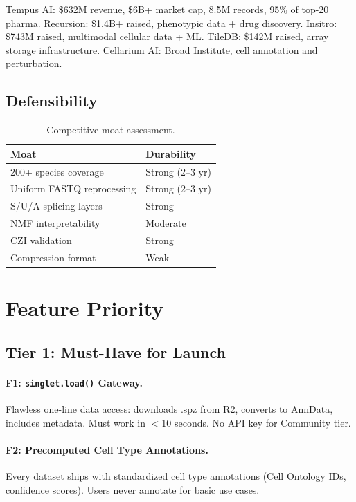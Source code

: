 \documentclass[10pt,twocolumn,letterpaper]{article}
\begin{document}
Tempus AI: \$632M revenue, \$6B+ market cap, 8.5M records, 95\% of top-20
pharma. Recursion: \$1.4B+ raised, phenotypic data + drug discovery.
Insitro: \$743M raised, multimodal cellular data + ML. TileDB: \$142M raised,
array storage infrastructure. Cellarium AI: Broad Institute, cell annotation
and perturbation.

\subsection{Defensibility}

\begin{table}[h]
\centering
\small
\begin{tabular}{@{}ll@{}}
\toprule
\textbf{Moat} & \textbf{Durability} \\
\midrule
200+ species coverage & Strong (2--3 yr) \\
Uniform FASTQ reprocessing & Strong (2--3 yr) \\
S/U/A splicing layers & Strong \\
NMF interpretability & Moderate \\
CZI validation & Strong \\
Compression format & Weak \\
\bottomrule
\end{tabular}
\caption{Competitive moat assessment.}
\label{tab:moats}
\end{table}

\section{Feature Priority}
\label{sec:features}

\subsection{Tier 1: Must-Have for Launch}

\paragraph{F1: \texttt{singlet.load()} Gateway.}
Flawless one-line data access: downloads .spz from R2, converts to AnnData,
includes metadata. Must work in $<$10 seconds. No API key for Community tier.

\paragraph{F2: Precomputed Cell Type Annotations.}
Every dataset ships with standardized cell type annotations (Cell Ontology IDs,
confidence scores). Users never annotate for basic use cases.
\end{document}

